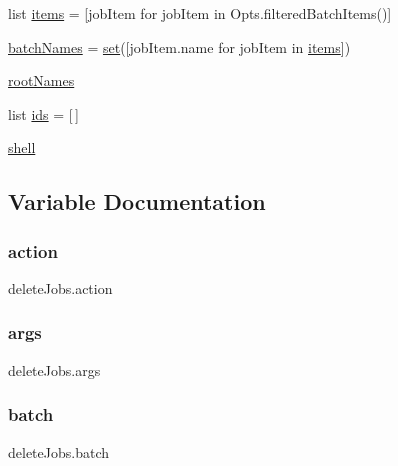 \begin{DoxyCompactItemize}
\item 
list \mbox{\hyperlink{namespacedeleteJobs_a8052b325571a71cd397d79b6c9947164}{items}} = \mbox{[}job\+Item for job\+Item in Opts.\+filtered\+Batch\+Items()\mbox{]}
\item 
\mbox{\hyperlink{namespacedeleteJobs_a55e9da2834432612dfe27c3f0fe1bc32}{batch\+Names}} = \mbox{\hyperlink{plotTT_8m_ae2445b699d1845d6abd1418ca39394c0}{set}}(\mbox{[}job\+Item.\+name for job\+Item in \mbox{\hyperlink{namespacedeleteJobs_a8052b325571a71cd397d79b6c9947164}{items}}\mbox{]})
\item 
\mbox{\hyperlink{namespacedeleteJobs_a8e7ece97de0df690e56be7d9878eadf8}{root\+Names}}
\item 
list \mbox{\hyperlink{namespacedeleteJobs_a53e585c5fa0c787fe4d7531315feb5be}{ids}} = \mbox{[}$\,$\mbox{]}
\item 
\mbox{\hyperlink{namespacedeleteJobs_a0e318f471e3cf59bff6b0209b11a1752}{shell}}
\end{DoxyCompactItemize}


\subsection{Variable Documentation}
\mbox{\label{namespacedeleteJobs_a0a1a15775632b58b51a4280c1db6bd4a}} 
\subsubsection{\texorpdfstring{action}{action}}
{\footnotesize\ttfamily delete\+Jobs.\+action}

\mbox{\label{namespacedeleteJobs_acc3288fec331cb34291501846be6e651}} 
\subsubsection{\texorpdfstring{args}{args}}
{\footnotesize\ttfamily delete\+Jobs.\+args}

\mbox{\label{namespacedeleteJobs_ae2c247c650877023c6a23c04466f14ac}} 
\subsubsection{\texorpdfstring{batch}{batch}}
{\footnotesize\ttfamily delete\+Jobs.\+batch}

